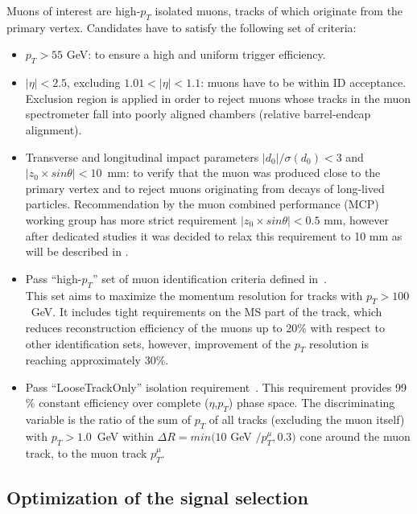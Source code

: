 Muons of interest are high-$p_T$ isolated muons, tracks of which originate
from the primary vertex. Candidates have to satisfy the following set of criteria:
\begin{itemize}
 \item $p_T > 55$ GeV: to ensure a high and uniform trigger efficiency.
 \item $|\eta|<2.5$, excluding $1.01 < |\eta| < 1.1$: muons have to be within ID acceptance. 
 Exclusion region is applied in order to reject muons whose tracks in the muon spectrometer fall into poorly aligned chambers (relative barrel-endcap alignment).
 \item Transverse and longitudinal impact parameters $|d_0|/\sigma(d_0)<3$ and $|z_0\times sin\theta|<10$~mm: 
 to verify that the muon was produced close to the primary vertex and to reject muons originating from decays of long-lived particles. Recommendation by the muon combined performance (MCP) working group has
 more strict requirement $|z_0 \times sin \theta| < 0.5$ mm, however after dedicated studies it 
 was decided to relax this requirement to 10 mm as will be described in .
 \item Pass ``high-$p_T$'' set of muon identification criteria defined in~\cite{muon_performance_2015}. \\ 
 This set aims to maximize the momentum resolution for tracks with $p_T > 100$~GeV.
 It includes tight requirements on the MS part of the track, which reduces reconstruction
 efficiency of the muons up to 20$\%$ with respect to other identification sets, however, 
 improvement of the $p_T$ resolution is reaching approximately 30$\%$.
 \item Pass ``LooseTrackOnly'' isolation requirement~\cite{muon_performance_2015}. 
 This requirement provides 99$\%$ constant efficiency over complete ($\eta$,$p_T$) phase space.
 The discriminating variable is the ratio of the sum of $p_T$ of all tracks (excluding the muon itself) with $p_T > 1.0$~GeV within $\Delta R = min(10$ GeV $/p_T^{\mu}, 0.3)$ 
 cone around the muon track, to the muon track $p_T^{\mu}$.
\end{itemize}  
 
\subsection{Optimization of the signal selection}
\label{subsec:wprime_cut_optimization}

